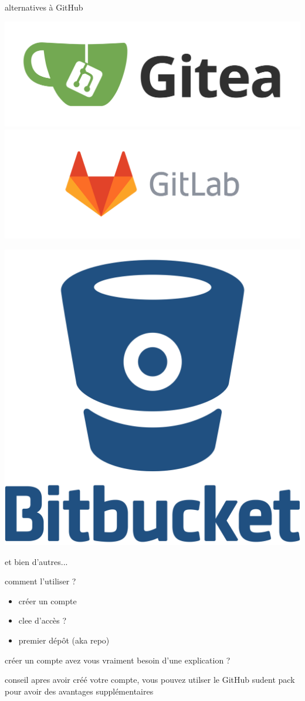 \documentclass[usenames,dvipsnames]{beamer}
\begin{document}
\begin{frame}[fragile]{alternatives à GitHub}
	\begin{center}
		\includegraphics[width=0.45\linewidth]{Im/gitea-logo.png}
		\includegraphics[width=0.45\linewidth]{Im/gitlab-logo.png}
	\end{center}
	\begin{center}		
		\includegraphics[width=0.3\linewidth]{Im/bitbucket-logo.png}
	\end{center}

	et bien d'autres...

\end{frame}

\begin{frame}[fragile]{comment l'utiliser ?}
	\begin{itemize}
		\item créer un compte
		\item clee d'accès ?
		\item premier dépôt (aka repo)
	\end{itemize}
\end{frame}

\begin{frame}[fragile]{créer un compte}
	avez vous vraiment besoin d'une explication ?

	\begin{blueblock}{conseil}
		apres avoir créé votre compte, vous pouvez utilser le GitHub sudent pack pour avoir des avantages supplémentaires 
	\end{blueblock}
\end{frame}
\end{document}
